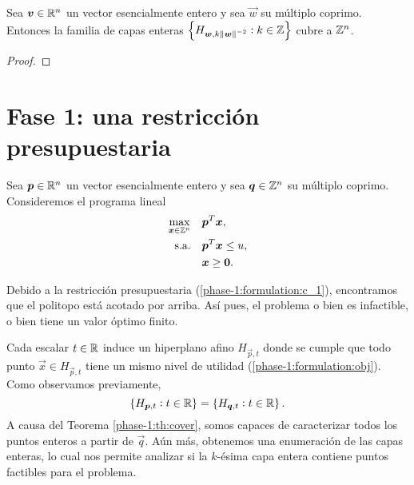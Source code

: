 \begin{theorem}
	\label{phase-1:th:cover}
	Sea $\boldsymbol{v} \in \mathbb{R}^n$ un vector esencialmente entero y sea $\vec{w}$ su múltiplo coprimo.
	Entonces la familia de capas enteras $\left\lbrace H_{\boldsymbol{w}, k\left\lVert \boldsymbol{w} \right\rVert^{-2}} \vcentcolon k
			\in \mathbb{Z} \right\rbrace$ cubre a $\mathbb{Z}^n$.
\end{theorem}
\begin{proof}
\end{proof}

\section{Fase 1: una restricción presupuestaria}

\noindent
Sea $\boldsymbol{p} \in \mathbb{R}^n$ un vector esencialmente entero y sea $\boldsymbol{q} \in \mathbb{Z}^n$ su múltiplo coprimo.
Consideremos el programa lineal 
\begin{subequations}
	\label{phase-1:formulation}
	\begin{align}
		\max_{\boldsymbol{x} \in \mathbb{Z}^n} \quad
			& \boldsymbol{p}^T\boldsymbol{x}, \label{phase-1:formulation:obj} \\
		\text{s.a.} \quad
			& \boldsymbol{p}^T\boldsymbol{x} \leq u, \label{phase-1:formulation:c_1} \\
			& \boldsymbol{x} \geq \boldsymbol{0}. \nonumber
	\end{align}
\end{subequations}

\begin{observation}
	Debido a la restricción presupuestaria (\ref{phase-1:formulation:c_1}), encontramos que el
	politopo está acotado por arriba. Así pues, el problema o bien es infactible, o bien tiene un
	valor óptimo finito.
\end{observation}

Cada escalar $t \in \mathbb{R}$ induce un hiperplano afino $H_{\vec{p}, t}$ donde se cumple que todo punto
$\vec{x} \in H_{\vec{p}, t}$ tiene un mismo nivel de utilidad (\ref{phase-1:formulation:obj}). Como
observamos previamente,
\begin{equation*}
	\left \lbrace H_{\boldsymbol{p}, t} \vcentcolon t \in \mathbb{R} \right\rbrace
	=
	\left \lbrace H_{\boldsymbol{q}, t} \vcentcolon t \in \mathbb{R} \right\rbrace.
\end{equation*}
A causa del Teorema \ref{phase-1:th:cover}, somos capaces de caracterizar todos los puntos enteros a
partir de $\vec{q}$. Aún más, obtenemos una enumeración de las capas enteras, lo cual nos permite
analizar si la $k$-ésima capa entera contiene puntos factibles para el problema.

